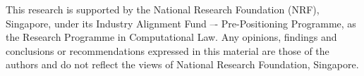 \documentclass[runningheads]{llncs}
\begin{document}
This research is supported by the National Research Foundation (NRF),
Singapore, under its Industry Alignment Fund –- Pre-Positioning Programme, as
the Research Programme in Computational Law. Any opinions, findings and
conclusions or recommendations expressed in this material are those of the
authors and do not reflect the views of National Research Foundation,
Singapore.


% 



% 
% 
% 
% 
\end{document}
